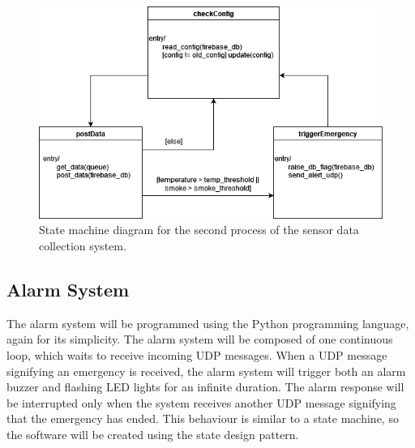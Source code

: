 \begin{figure}[H]
    \centering
    \includegraphics[width=\linewidth]{../assets/DataCollectionLogicLoop.png}
    \caption{State machine diagram for the second process of the sensor data collection system.}
\end{figure}

\subsection{Alarm System}

The alarm system will be programmed using the Python programming language, again for its simplicity. The alarm system
will be composed of one continuous loop, which waits to receive incoming UDP messages. When a UDP message signifying an
emergency is received, the alarm system will trigger both an alarm buzzer and flashing LED lights for an infinite
duration. The alarm response will be interrupted only when the system receives another UDP message signifying that the
emergency has ended. This behaviour is similar to a state machine, so the software will be created using the state
design pattern.

